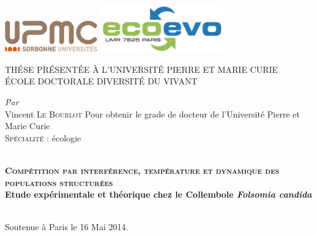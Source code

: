 
\begin{titlingpage}
\begin{Spacing}{1}
\begin{center}     

\includegraphics[width=0.3\textwidth]{0_Title/upmc.png}\hfill
\includegraphics[width=0.4\textwidth]{0_Title/LogoLabo.png}\\[1cm]
 
\begin{Spacing}{1.5}
\textsc{\LARGE THÉSE PRÉSENTÉE À L'UNIVERSITÉ PIERRE ET MARIE
CURIE}\\[0.8cm]

\textsc{ÉCOLE DOCTORALE DIVERSITÉ DU VIVANT}
\end{Spacing} 
\vfill

\emph{Par}\\ 
Vincent \textsc{Le Bourlot} \vfill
Pour obtenir le grade de docteur de l'Université Pierre et Marie Curie\\
\textsc{Spécialité} : écologie\\

\vfill


\HRule \\[0.2cm] 
{\textbf{\LARGE\textsc{Compétition par interférence, température et dynamique
des populations structurées}\\[0.7cm] \Large Etude expérimentale et théorique
chez le Collembole \textit{Folsomia candida}}}\\[0.2cm] \HRule \\ 

\vfill
\end{center} 
Soutenue à Paris le 16 Mai 2014.\\
\vfill

\begin{flushleft}
\begingroup
    \fontsize{11pt}{12pt}\selectfont



\end{flushleft}
\end{Spacing}
\end{titlingpage}
